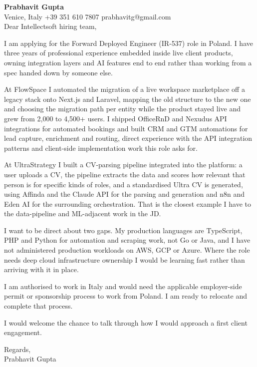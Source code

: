 \documentclass[a4paper,10.5pt]{article}
\begin{document}
\textbf{Prabhavit Gupta}\\
Venice, Italy \textbar{} +39 351 610 7807 \textbar{} prabhavitg@gmail.com\\[10pt]
Dear Intellectsoft hiring team,

I am applying for the Forward Deployed Engineer (IR-537) role in Poland. I have three years of professional experience embedded inside live client products, owning integration layers and AI features end to end rather than working from a spec handed down by someone else.

At FlowSpace I automated the migration of a live workspace marketplace off a legacy stack onto Next.js and Laravel, mapping the old structure to the new one and choosing the migration path per entity while the product stayed live and grew from 2,000 to 4,500+ users. I shipped OfficeRnD and Nexudus API integrations for automated bookings and built CRM and GTM automations for lead capture, enrichment and routing, direct experience with the API integration patterns and client-side implementation work this role asks for.

At UltraStrategy I built a CV-parsing pipeline integrated into the platform: a user uploads a CV, the pipeline extracts the data and scores how relevant that person is for specific kinds of roles, and a standardised Ultra CV is generated, using Affinda and the Claude API for the parsing and generation and n8n and Eden AI for the surrounding orchestration. That is the closest example I have to the data-pipeline and ML-adjacent work in the JD.

I want to be direct about two gaps. My production languages are TypeScript, PHP and Python for automation and scraping work, not Go or Java, and I have not administered production workloads on AWS, GCP or Azure. Where the role needs deep cloud infrastructure ownership I would be learning fast rather than arriving with it in place.

I am authorised to work in Italy and would need the applicable employer-side permit or sponsorship process to work from Poland. I am ready to relocate and complete that process.

I would welcome the chance to talk through how I would approach a first client engagement.

Regards,\\
Prabhavit Gupta
\end{document}
